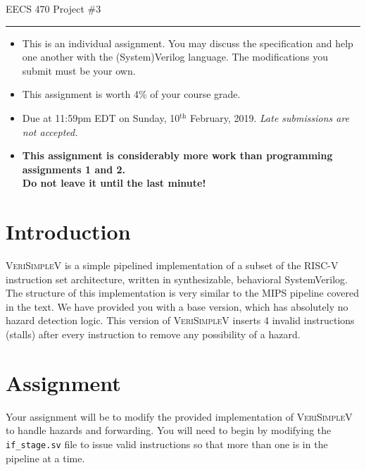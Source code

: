 \documentclass{article}
\newcommand{\shortbar}{
	\vspace*{-12pt}
	\begin{center}
		\rule{5ex}{0.1pt}
	\end{center}
}
\newcommand{\project}[1]{
	\begin{center}
		\LARGE{
			\vspace*{-12pt}
			EECS 470 Project \#3
			\shortbar
		}
	\end{center}
}
\begin{document}
\vspace*{-20pt}
\project{3}

\begin{itemize}
	\item This is an individual assignment. You may discuss the specification
		and help one another with the (System)Verilog language. The
		modifications you submit must be your own.
	\item This assignment is worth 4\% of your course grade. 
	\item Due at 11:59pm EDT on Sunday, 10$^{\text{th}}$ February, 2019. 
		\emph{Late submissions are not accepted.}
	\item \textbf{This assignment is considerably more work than programming assignments 1 and 2. \\Do not leave it until the last minute!}

\end{itemize}
\hrulefill

\section{Introduction}
\textsc{VeriSimpleV} is a simple pipelined implementation of a subset of the
RISC-V instruction set architecture, written in synthesizable, behavioral
SystemVerilog. The structure of this implementation is very similar to the MIPS
pipeline covered in the text. We have provided you with a base version, which
has absolutely no hazard detection logic. This version of \textsc{VeriSimpleV}
inserts 4 invalid instructions (stalls) after every instruction to remove any
possibility of a hazard.

\section{Assignment}
Your assignment will be to modify the provided implementation of
\textsc{VeriSimpleV} to handle hazards and forwarding. You will need to begin by
modifying the \texttt{if\_stage.sv} file to issue valid instructions so that more
than one is in the pipeline at a time.
\end{document}
